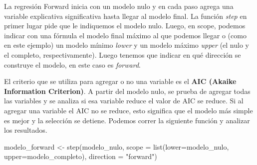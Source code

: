 \documentclass[
]{book}
\newenvironment{Shaded}{\begin{snugshade}}{\end{snugshade}}
\newcommand{\AttributeTok}[1]{\textcolor[rgb]{0.77,0.63,0.00}{#1}}
\newcommand{\FunctionTok}[1]{\textcolor[rgb]{0.00,0.00,0.00}{#1}}
\newcommand{\NormalTok}[1]{#1}
\newcommand{\OtherTok}[1]{\textcolor[rgb]{0.56,0.35,0.01}{#1}}
\newcommand{\StringTok}[1]{\textcolor[rgb]{0.31,0.60,0.02}{#1}}
\begin{document}
La regresión Forward inicia con un modelo nulo y en cada paso agrega una variable explicativa significativa hasta llegar al modelo final.
La función \emph{step} en primer lugar pide que le indiquemos el modelo nulo. Luego, en scope, podemos indicar con una fórmula el modelo final máximo al que podemos llegar o (como en este ejemplo) un modelo mínimo \emph{lower} y un modelo máximo \emph{upper} (el nulo y el completo, respectivamente). Luego tenemos que indicar en qué dirección se construye el modelo, en este caso es \emph{forward}.

El criterio que se utiliza para agregar o no una variable es el \textbf{AIC (Akaike Information Criterion)}. A partir del modelo nulo, se prueba de agregar todas las variables y se analiza si esa variable reduce el valor de AIC se reduce. Si al agregar una variable el AIC no se reduce, esto significa que el modelo más simple es mejor y la selección se detiene. Podemos correr la siguiente función y analizar los resultados.

\begin{Shaded}
\begin{Highlighting}[]
\NormalTok{modelo\_forward }\OtherTok{\textless{}{-}} \FunctionTok{step}\NormalTok{(modelo\_nulo, }\AttributeTok{scope =} \FunctionTok{list}\NormalTok{(}\AttributeTok{lower=}\NormalTok{modelo\_nulo, }\AttributeTok{upper=}\NormalTok{modelo\_completo), }\AttributeTok{direction =} \StringTok{"forward"}\NormalTok{)}
\end{Highlighting}
\end{Shaded}
\end{document}
